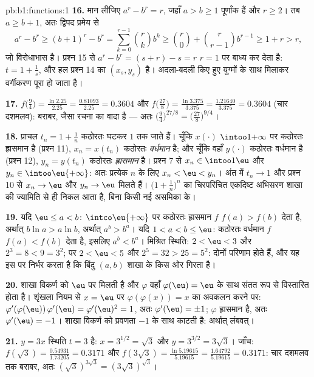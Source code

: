 \begin{solution}{pb:b1:functions:1}
\textbf{16.} मान लीजिए $a^r - b^r = r$, जहाँ $a > b \geq 1$ पूर्णांक हैं और
$r \geq 2$। तब $a \geq b + 1$, अतः द्विपद प्रमेय से
\[
a^r - b^r \geq (b+1)^r - b^r
= \sum_{k=0}^{r-1}\binom rk b^k
\geq \binom r0 + \binom r{r-1} b^{r-1}
\geq 1 + r > r ,
\]
जो विरोधाभास है। प्रश्न 15 से $a^r - b^r = (s + r) - s = r$ $r = 1$ पर बाध्य
कर देता है: $t = 1 + \frac1s$, और हल प्रश्न 14 का $(x_s, y_s)$ है। अदला-बदली
किए हुए युग्मों के साथ मिलाकर वर्गीकरण पूरा हो जाता है।

\textbf{17.} $f\bigl(\tfrac94\bigr) = \frac{\ln 2.25}{2.25} =
\frac{0.81093}{2.25} = 0.3604$ और $f\bigl(\tfrac{27}8\bigr) = \frac{\ln
3.375}{3.375} = \frac{1.21640}{3.375} = 0.3604$ (चार दशमलव): बराबर, जैसा
रचना का वादा है --- अतः $\bigl(\tfrac94\bigr)^{27/8} =
\bigl(\tfrac{27}8\bigr)^{9/4}$।

\textbf{18.} प्राचल $t_n = 1 + \frac1n$ कठोरतः घटकर $1$ तक जाते हैं। चूँकि
$x(\cdot)$ $\intoo1{+\infty}$ पर कठोरतः ह्रासमान है (प्रश्न 11), $x_n =
x(t_n)$ कठोरतः \emph{वर्धमान} है; और चूँकि वहाँ $y(\cdot)$ कठोरतः वर्धमान है
(प्रश्न 12), $y_n = y(t_n)$ कठोरतः \emph{ह्रासमान} है। प्रश्न 7 से $x_n \in
\intoo1\eu$ और $y_n \in \intoo\eu{+\infty}$: अतः प्रत्येक $n$ के लिए $x_n <
\eu < y_n$। अंत में $t_n \to 1$ और प्रश्न 10 से $x_n \to \eu$ और $y_n \to
\eu$ मिलते हैं। $\bigl(1 + \frac1n\bigr)^n$ का चिरपरिचित एकदिष्ट अभिसरण शाखा
की ज्यामिति से ही निकल आता है, बिना किसी नई असमिका के।

\textbf{19.} यदि $\eu \leq a < b$: $\intco\eu{+\infty}$ पर कठोरतः ह्रासमान
$f$ $f(a) > f(b)$ देता है, अर्थात् $b\ln a > a\ln b$, अर्थात् $a^b > b^a$।
यदि $1 < a < b \leq \eu$: कठोरतः वर्धमान $f$ $f(a) < f(b)$ देता है, इसलिए
$a^b < b^a$। मिश्रित स्थिति: $2 < \eu < 3$ और $2^3 = 8 < 9 = 3^2$; पर $2 <
\eu < 5$ और $2^5 = 32 > 25 = 5^2$: दोनों परिणाम होते हैं, और यह इस पर निर्भर
करता है कि बिंदु $(a, b)$ शाखा के किस ओर गिरता है।

\textbf{20.} शाखा विकर्ण को $\eu$ पर मिलती है और $\varphi$ वहाँ
$\varphi(\eu) = \eu$ के साथ संतत रूप से विस्तारित होता है। शृंखला नियम से $x
= \eu$ पर $\varphi(\varphi(x)) = x$ का अवकलन करने पर:
$\varphi'(\varphi(\eu))\,\varphi'(\eu) = \varphi'(\eu)^2 = 1$, अतः
$\varphi'(\eu) = \pm1$; $\varphi$ ह्रासमान है, अतः $\varphi'(\eu) = -1$।
शाखा विकर्ण को प्रवणता $-1$ के साथ काटती है: अर्थात् लंबवत्।

\textbf{21.} $y = 3x$ स्थिति $t = 3$ है: $x = 3^{1/2} = \sqrt3$ और $y =
3^{3/2} = 3\sqrt3$। जाँच: $f(\sqrt3) = \frac{0.54931}{1.73205} = 0.3171$ और
$f(3\sqrt3) = \frac{\ln 5.19615}{5.19615} = \frac{1.64792}{5.19615} =
0.3171$: चार दशमलव तक बराबर, अतः $(\sqrt3)^{3\sqrt3} = (3\sqrt3)^{\sqrt3}$।


\end{solution}
